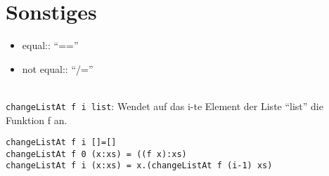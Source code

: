 \section{Sonstiges}
\begin{itemize}
	\item equal:: \enquote{==}
	\item not equal:: \enquote{/=}
\end{itemize}

\\
\texttt{changeListAt f i list}: Wendet auf das i-te Element der Liste \enquote{list} die Funktion f an.
\begin{lstlisting}
changeListAt f i []=[]
changeListAt f 0 (x:xs) = ((f x):xs)
changeListAt f i (x:xs) = x.(changeListAt f (i-1) xs)
\end{lstlisting}